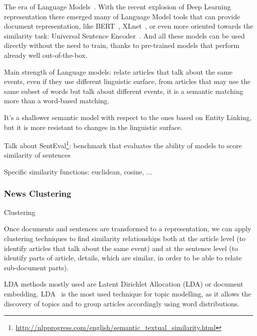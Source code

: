 The era of Language Models~\cite{devlin2018bert,cer2018universal,yang2019xlnet}.
With the recent explosion of Deep Learning representation there emerged many of Language Model tools that can provide document representation, like BERT~\cite{devlin2018bert}, XLnet~\cite{yang2019xlnet}, or even more oriented towards the similarity task: Universal Sentence Encoder~\cite{cer2018universal}.
And all these models can be used directly without the need to train, thanks to pre-trained models that perform already well out-of-the-box.

Main strength of Language models:
relate articles that talk about the same events, even if they use different linguistic surface, from articles that may use the same subset of words but talk about different events, it is a semantic matching more than a word-based matching. 

It's a shallower semantic model with respect to the ones based on Entity Linking, but it is more resistant to changes in the linguistic surface.

Talk about SentEval\footnote{\url{http://nlpprogress.com/english/semantic_textual_similarity.html}}: benchmark that evaluates the ability of models to score similarity of sentences









Specific similarity functions: euclidean, cosine, ...





\subsubsection{News Clustering}
Clustering

Once documents and sentences are transformed to a representation, we can apply clustering techniques to find similarity relationships both at the article level (to identify articles that talk about the same event) and at the sentence level (to identify parts of article, details, which are similar, in order to be able to relate sub-document parts).

LDA
methods mostly used are Latent Dirichlet Allocation (LDA) or document embedding.
LDA~\cite{blei2003latent} is the most used technique for topic modelling, as it allows the discovery of topics and to group articles accordingly using word distributions.

